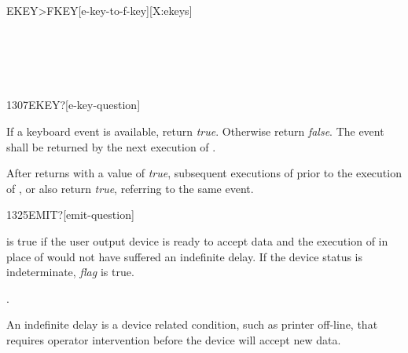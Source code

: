 \begin{worddef}[EKEYtoFKEY]{}{EKEY>FKEY}[e-key-to-f-key][X:ekeys]
\begin{testing}
		 \\
		 \\

		 \\
	\end{testing}
\end{worddef}



\begin{worddef}[EKEYq]{1307}{EKEY?}[e-key-question]
\item {}

	If a keyboard event is available, return \emph{true}. Otherwise
	return \emph{false}. The event shall be returned by the next
	execution of .

	After  returns with a value of \emph{true},
	subsequent executions of  prior to the execution of
	,  or  also return
	\emph{true}, referring to the same event.
\end{worddef}


\begin{worddef}[EMITq]{1325}{EMIT?}[emit-question]
\item {}

	 is true if the user output device is ready to
	accept data and the execution of  in place of
	 would not have suffered an indefinite delay. If
	the device status is indeterminate, \emph{flag} is true.

\see {}.

	\begin{rationale} %
		An indefinite delay is a device related condition, such as
		printer off-line, that requires operator intervention before
		the device will accept new data.
	\end{rationale}
\end{worddef}


